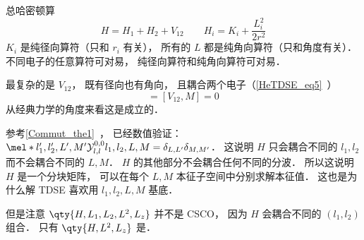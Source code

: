 
总哈密顿算
\begin{equation}
H = H_1 + H_2 + V_{12} \qquad H_i = K_i + \frac{L_i^2}{2r^2}
\end{equation}
$K_i$ 是纯径向算符（只和 $r_i$ 有关）， 所有的 $L$ 都是纯角向算符（只和角度有关）． 不同电子的任意算符可对易， 纯径向算符和纯角向算符可对易．

最复杂的是 $V_{12}$， 既有径向也有角向， 且耦合两个电子（\autoref{HeTDSE_eq5}~）
\begin{equation}
[V_{12}, L^2] = [V_{12}, M] = 0
\end{equation}
从经典力学的角度来看这是成立的．

参考\autoref{Commut_the1}~， 已经数值验证： $\mel*{l'_1,l'_2,L',M'}{\mathcal Y_{l,l}^{0,0}}{l_1,l_2,L,M} = \delta_{L,L'}\delta_{M,M'}$． 这说明 $H$ 只会耦合不同的 $l_1,l_2$ 而不会耦合不同的 $L,M$． $H$ 的其他部分不会耦合任何不同的分波． 所以这说明 $H$ 是一个分块矩阵， 可以在每个 $L,M$ 本征子空间中分别求解本征值． 这也是为什么解 TDSE 喜欢用 $l_1,l_2,L,M$ 基底．

但是注意 $\qty{H,L_1,L_2,L^2,L_z}$ 并不是 CSCO， 因为 $H$ 会耦合不同的 $(l_1,l_2)$ 组合． 只有 $\qty{H,L^2,L_z}$ 是．
